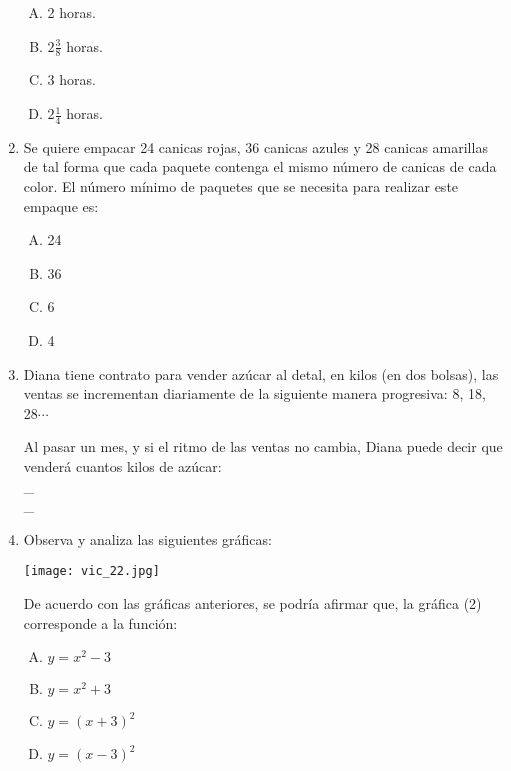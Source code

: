 \begin{enumerate}
\begin{enumerate}[(A)]
\item 2 horas.
\item $2\frac{3}{8}$ horas.
\item 3 horas.
\item $2\frac{1}{4}$ horas.
\end{enumerate}
\newpage
\item Se quiere empacar 24 canicas rojas, 36 canicas azules  y  28  canicas amarillas  de tal forma que cada paquete contenga el mismo número de canicas de cada color. El número mínimo de paquetes que se necesita para realizar este empaque es:\label{vic-20}

\begin{enumerate}[(A)]
\item 24
\item 36
\item 6
\item 4
\end{enumerate}

\item Diana tiene contrato para vender azúcar al detal, en kilos (en dos bolsas), las ventas se incrementan diariamente de la siguiente manera progresiva: 8, 18, 28$\cdots$  \label{vic-21}

Al pasar un mes, y si el ritmo de las ventas no cambia, Diana puede decir que venderá cuantos kilos de azúcar:\hrulefill\\
\_\hrulefill\\
\_\hrulefill\\



\item Observa y analiza las siguientes gráficas:\label{vic-22}

\texttt{[image: vic\_22.jpg]} 

De acuerdo con las gráficas anteriores, se podría afirmar que, la gráfica (2) corresponde a la función:

\begin{enumerate}[(A)]
\item $y=x^2-3$
\item $y=x^2+3$
\item $y=(x+3)^2$
\item $y=(x-3)^2$
\end{enumerate}


\end{enumerate}
